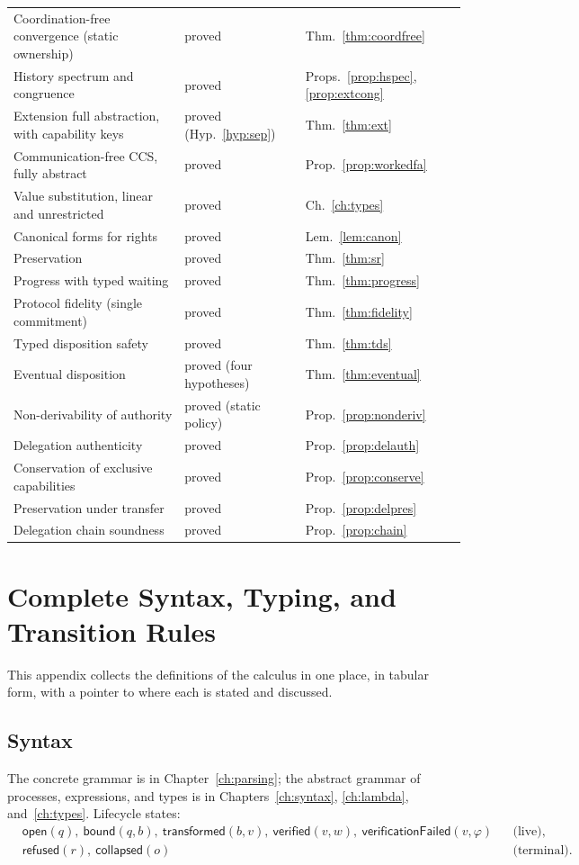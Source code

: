 \documentclass[11pt,openany]{book}
\theoremstyle{remark}
\begin{document}
{\begin{longtable}{L{6.2cm}L{4.4cm}l}
Coordination-free convergence (static ownership) & proved & Thm.~\ref{thm:coordfree}\\
History spectrum and congruence & proved & Props.~\ref{prop:hspec}, \ref{prop:extcong}\\
Extension full abstraction, with capability keys & proved (Hyp.~\ref{hyp:sep}) & Thm.~\ref{thm:ext}\\
Communication-free CCS, fully abstract & proved & Prop.~\ref{prop:workedfa}\\
Value substitution, linear and unrestricted & proved & Ch.~\ref{ch:types}\\
Canonical forms for rights & proved & Lem.~\ref{lem:canon}\\
Preservation & proved & Thm.~\ref{thm:sr}\\
Progress with typed waiting & proved & Thm.~\ref{thm:progress}\\
Protocol fidelity (single commitment) & proved & Thm.~\ref{thm:fidelity}\\
Typed disposition safety & proved & Thm.~\ref{thm:tds}\\
Eventual disposition & proved (four hypotheses) & Thm.~\ref{thm:eventual}\\
Non-derivability of authority & proved (static policy) & Prop.~\ref{prop:nonderiv}\\
Delegation authenticity & proved & Prop.~\ref{prop:delauth}\\
Conservation of exclusive capabilities & proved & Prop.~\ref{prop:conserve}\\
Preservation under transfer & proved & Prop.~\ref{prop:delpres}\\
Delegation chain soundness & proved & Prop.~\ref{prop:chain}\\
\bottomrule
\end{longtable}
}

\chapter{Complete Syntax, Typing, and Transition Rules}
\label{app:rules}

This appendix collects the definitions of the calculus in one place, in
tabular form, with a pointer to where each is stated and discussed.

\section{Syntax}

The concrete grammar is in Chapter~\ref{ch:parsing}; the abstract
grammar of processes, expressions, and types is in
Chapters~\ref{ch:syntax}, \ref{ch:lambda}, and~\ref{ch:types}. Lifecycle
states:
\[
\begin{aligned}
&\mathsf{open}(q),\ \mathsf{bound}(q,b),\ \mathsf{transformed}(b,v),\
\mathsf{verified}(v,w),\ \mathsf{verificationFailed}(v,\varphi)
&&\text{(live)},\\
&\mathsf{refused}(r),\ \mathsf{collapsed}(o)&&\text{(terminal)}.
\end{aligned}
\]
\end{document}
